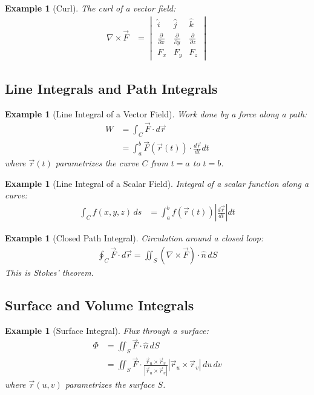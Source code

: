\documentclass{article}
\newtheorem{example}[theorem]{Example}
\begin{document}
\begin{example}[Curl]
The curl of a vector field:
\begin{align*}
    \nabla \times \vec{F} &= \begin{vmatrix}
        \hat{i} & \hat{j} & \hat{k} \\
        \frac{\partial}{\partial x} & \frac{\partial}{\partial y} & \frac{\partial}{\partial z} \\
        F_x & F_y & F_z
    \end{vmatrix}
\end{align*}
\end{example}

\subsection{Line Integrals and Path Integrals}

\begin{example}[Line Integral of a Vector Field]
Work done by a force along a path:
\begin{align*}
    W &= \int_C \vec{F} \cdot d\vec{r} \\
    &= \int_a^b \vec{F}(\vec{r}(t)) \cdot \frac{d\vec{r}}{dt} dt
\end{align*}
where $\vec{r}(t)$ parametrizes the curve $C$ from $t=a$ to $t=b$.
\end{example}

\begin{example}[Line Integral of a Scalar Field]
Integral of a scalar function along a curve:
\begin{align*}
    \int_C f(x,y,z) \, ds &= \int_a^b f(\vec{r}(t)) \left|\frac{d\vec{r}}{dt}\right| dt
\end{align*}
\end{example}

\begin{example}[Closed Path Integral]
Circulation around a closed loop:
\begin{align*}
    \oint_C \vec{F} \cdot d\vec{r} = \iint_S (\nabla \times \vec{F}) \cdot \hat{n} \, dS
\end{align*}
This is Stokes' theorem.
\end{example}

\subsection{Surface and Volume Integrals}

\begin{example}[Surface Integral]
Flux through a surface:
\begin{align*}
    \Phi &= \iint_S \vec{F} \cdot \hat{n} \, dS \\
    &= \iint_S \vec{F} \cdot \frac{\vec{r}_u \times \vec{r}_v}{|\vec{r}_u \times \vec{r}_v|} |\vec{r}_u \times \vec{r}_v| \, du \, dv
\end{align*}
where $\vec{r}(u,v)$ parametrizes the surface $S$.
\end{example}
\end{document}
